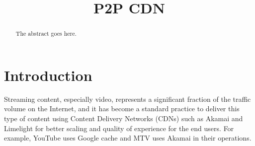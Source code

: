 \documentclass[conference]{IEEEtran}
\begin{document}
%
\title{P2P CDN}

\author{
 \quad
{}
}








\maketitle


\begin{abstract}
The abstract goes here.
\end{abstract}





%
\IEEEpeerreviewmaketitle



\section{Introduction}
Streaming content, especially video, represents a significant fraction of the traffic volume on the Internet, and it has become a standard practice to deliver this type of content using Content Delivery Networks (CDNs) such as Akamai and Limelight for better scaling and quality of experience for the end users. 
For example, YouTube uses Google cache and MTV uses Akamai in their operations.
\end{document}
